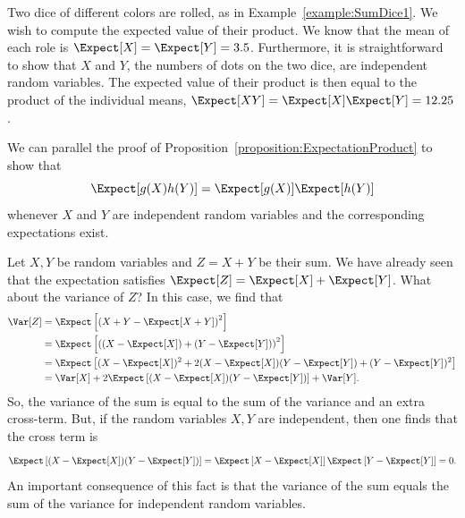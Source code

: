 \begin{example}
Two dice of different colors are rolled, as in Example~\ref{example:SumDice1}.
We wish to compute the expected value of their product.
We know that the mean of each role is $\Expect [X] = \Expect [Y] = 3.5$.
Furthermore, it is straightforward to show that $X$ and $Y$, the numbers of dots on the two dice, are independent random variables.
The expected value of their product is then equal to the product of the individual means, $\Expect [XY] = \Expect [X] \Expect [Y] = 12.25$.
\end{example}

We can parallel the proof of Proposition~\ref{proposition:ExpectationProduct} to show that
\begin{equation} \label{equation:DiscreteProduct}
\Expect[ g(X) h(Y) ] = \Expect [ g(X) ] \Expect [ h(Y) ]
\end{equation}
whenever $X$ and $Y$ are independent random variables and the corresponding expectations exist.

\begin{example}
Let $X,Y$ be random variables and $Z=X+Y$ be their sum.
We have already seen that the expectation satisfies $\Expect [Z] = \Expect[X] + \Expect[Y]$.
What about the variance of $Z$?
In this case, we find that
\begin{align*}
\Var [Z]
&= \Expect \left[ \left(X+Y - \Expect[X+Y] \right)^2  \right] \\
&= \Expect \left[ \left((X-\Expect[X]) + (Y-\Expect[Y]) \right)^2  \right] \\
&= \Expect \left[ (X-\Expect[X])^2 + 2(X-\Expect[X])(Y-\Expect[Y]) + (Y-\Expect[Y])^2 \right] \\
&= \Var[X] + 2 \Expect \left[(X-\Expect[X])(Y-\Expect[Y])\right] + \Var[Y] . 
\end{align*}
So, the variance of the sum is equal to the sum of the variance and an extra cross-term.
But, if the random variables $X,Y$ are independent, then one finds that the cross term is
\[ \Expect \left[(X-\Expect[X])(Y-\Expect[Y])\right] = \Expect \left[X-\Expect[X] \right] \Expect\left[Y-\Expect[Y]\right] = 0. \]
An important consequence of this fact is that the variance of the sum equals the sum of the variance for independent random variables.
\end{example}


